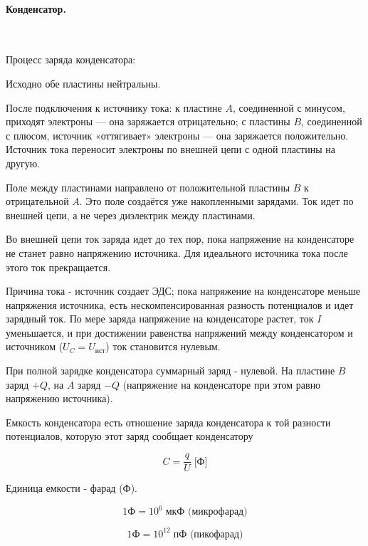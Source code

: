 \documentclass[a4paper,12pt]{article}
\begin{document}
		\clearpage
		\paragraph{Конденсатор.} \

		Процесс заряда конденсатора:

		Исходно обе пластины нейтральны. 
		
		После подключения к источнику тока: к пластине $A$, соединенной с минусом, 
		приходят электроны — она заряжается отрицательно; с пластины $B$, соединенной с 
		плюсом, источник «оттягивает» электроны — она заряжается положительно. Источник 
		тока переносит электроны по внешней цепи с одной пластины на другую. 
		
		Поле между пластинами направлено от положительной пластины $B$ к отрицательной 
		$A$. Это поле создаётся уже накопленными зарядами. Ток идет по внешней цепи, а 
		не через диэлектрик между пластинами. 
		
		Во внешней цепи ток заряда идет до тех пор, пока напряжение на конденсаторе не
		станет равно напряжению источника. Для идеального источника тока после этого ток
		прекращается. 
		
		Причина тока - источник создает ЭДС; пока напряжение на конденсаторе меньше 
		напряжения источника, есть нескомпенсированная разность потенциалов и идет 
		зарядный ток. По мере заряда напряжение на конденсаторе растет, ток $I$ 
		уменьшается, и при достижении равенства напряжений между конденсатором и 
		источником ($U_C = U_{\text{ист}}$) ток становится нулевым.

		При полной зарядке конденсатора суммарный заряд - нулевой. На пластине $B$ заряд 
		$+Q$, на $A$ заряд $-Q$ (напряжение на конденсаторе при этом равно напряжению
		источника).

		Емкость конденсатора есть отношение заряда конденсатора к той разности 
		потенциалов, которую этот заряд сообщает конденсатору

		\begin{equation}
			C = \frac{q}{U} \; \text{[Ф]}
		\end{equation}

		Единица емкости - фарад (Ф).

		\begin{equation*}
			1 \text{Ф} = 10^6 \; \text{мкФ (микрофарад)}
		\end{equation*}

		\begin{equation*}
			1 \text{Ф} = 10^{12} \; \text{пФ (пикофарад)}
		\end{equation*}
\end{document}
